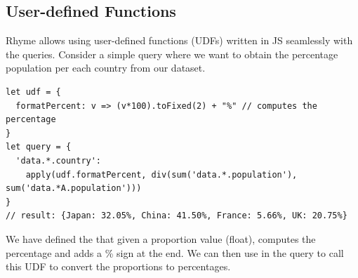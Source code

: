 \documentclass[runningheads]{llncs}
\newcommand{\lang}{Rhyme}
\begin{document}


\vspace{-3mm}
\subsection{User-defined Functions}
\vspace{-2mm}
\lang{} allows using user-defined functions (UDFs) written in JS seamlessly with the
queries.
Consider a simple query where we want to obtain the percentage population per each
country from our dataset.

\begin{lstlisting}[style=JavaScript, columns=flexible]
let udf = {
  formatPercent: v => (v*100).toFixed(2) + "%" // computes the percentage 
}
let query = {
  'data.*.country':
    apply(udf.formatPercent, div(sum('data.*.population'), sum('data.*A.population')))
}
// result: {Japan: 32.05%, China: 41.50%, France: 5.66%, UK: 20.75%}
\end{lstlisting}

We have defined the  that given a proportion value (float),
computes the percentage and adds a \% sign at the end.
We can then use  in the query to call this UDF to convert the
proportions to percentages.



\end{document}
